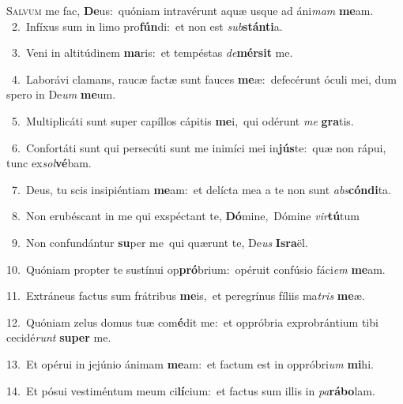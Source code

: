 \lettrine{\initial\textcolor{\initialcolor}{S}}{alvum} me fac, \textbf{De}\-us:~\star quóniam intravérunt aquæ usque ad áni\textit{mam} \textbf{me}\-am.\\
{\numbfont\textcolor{\numbcolor}{~2.}}~Infíxus sum in limo pro\-\textbf{fún}\-di:~\star et non est \textit{sub}\-\textbf{stán}\textbf{ti}a.\par
{\numbfont\textcolor{\numbcolor}{~3.}}~Veni in altitúdinem \textbf{ma}\-ris:~\star et tempéstas \textit{de}\-\textbf{mér}\textbf{sit} me.\par
{\numbfont\textcolor{\numbcolor}{~4.}}~Laborávi clamans, raucæ factæ sunt fauces \textbf{me}\-æ:~\star defecérunt óculi mei, dum spero in De\textit{um} \textbf{me}\-um.\par
{\numbfont\textcolor{\numbcolor}{~5.}}~Multiplicáti sunt super capíllos cápitis \textbf{me}\-i,~\star qui odérunt \textit{me} \textbf{gra}\-tis.\par
{\numbfont\textcolor{\numbcolor}{~6.}}~Confortáti sunt qui persecúti sunt me inimíci mei in\-\textbf{jús}\-te:~\star quæ non rápui, tunc ex\-\textit{sol}\-\textbf{vé}bam.\par
{\numbfont\textcolor{\numbcolor}{~7.}}~Deus, tu scis insipiéntiam \textbf{me}\-am:~\star et delícta mea a te non sunt \textit{abs}\-\textbf{cón}\textbf{di}ta.\par
{\numbfont\textcolor{\numbcolor}{~8.}}~Non erubéscant in me qui exspéctant te, \textbf{Dó}\-mine,~\star Dómine \textit{vir}\-\textbf{tú}tum\par
{\numbfont\textcolor{\numbcolor}{~9.}}~Non confundántur \textbf{su}\-per me~\star qui quærunt te, De\textit{us} \textbf{Is}\-\textbf{ra}ël.\par
{\numbfont\textcolor{\numbcolor}{10.}}~Quóniam propter te sustínui op\-\textbf{pró}\-brium:~\star opéruit confúsio fáci\textit{em} \textbf{me}\-am.\par
{\numbfont\textcolor{\numbcolor}{11.}}~Extráneus factus sum frátribus \textbf{me}\-is,~\star et peregrínus fíliis ma\textit{tris} \textbf{me}\-æ.\par
{\numbfont\textcolor{\numbcolor}{12.}}~Quóniam zelus domus tuæ com\-\textbf{é}\-dit me:~\star et oppróbria exprobrántium tibi cecidé\textit{runt} \textbf{su}\-\textbf{per} me.\par
{\numbfont\textcolor{\numbcolor}{13.}}~Et opérui in jejúnio ánimam \textbf{me}\-am:~\star et factum est in oppróbri\textit{um} \textbf{mi}\-hi.\par
{\numbfont\textcolor{\numbcolor}{14.}}~Et pósui vestiméntum meum ci\-\textbf{lí}\-cium:~\star et factus sum illis in \textit{pa}\-\textbf{rá}\textbf{bo}lam.\par
